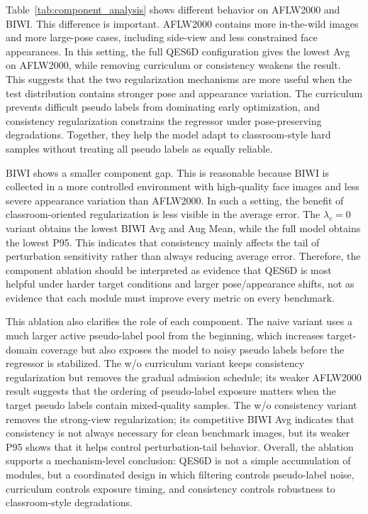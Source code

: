 \documentclass[preprint,12pt]{elsarticle}
\begin{document}
Table~\ref{tab:component_analysis} shows different behavior on AFLW2000 and BIWI. This difference is important. AFLW2000 contains more in-the-wild images and more large-pose cases, including side-view and less constrained face appearances. In this setting, the full QES6D configuration gives the lowest Avg on AFLW2000, while removing curriculum or consistency weakens the result. This suggests that the two regularization mechanisms are more useful when the test distribution contains stronger pose and appearance variation. The curriculum prevents difficult pseudo labels from dominating early optimization, and consistency regularization constrains the regressor under pose-preserving degradations. Together, they help the model adapt to classroom-style hard samples without treating all pseudo labels as equally reliable.

BIWI shows a smaller component gap. This is reasonable because BIWI is collected in a more controlled environment with high-quality face images and less severe appearance variation than AFLW2000. In such a setting, the benefit of classroom-oriented regularization is less visible in the average error. The $\lambda_c=0$ variant obtains the lowest BIWI Avg and Aug Mean, while the full model obtains the lowest P95. This indicates that consistency mainly affects the tail of perturbation sensitivity rather than always reducing average error. Therefore, the component ablation should be interpreted as evidence that QES6D is most helpful under harder target conditions and larger pose/appearance shifts, not as evidence that each module must improve every metric on every benchmark.

This ablation also clarifies the role of each component. The naive variant uses a much larger active pseudo-label pool from the beginning, which increases target-domain coverage but also exposes the model to noisy pseudo labels before the regressor is stabilized. The w/o curriculum variant keeps consistency regularization but removes the gradual admission schedule; its weaker AFLW2000 result suggests that the ordering of pseudo-label exposure matters when the target pseudo labels contain mixed-quality samples. The w/o consistency variant removes the strong-view regularization; its competitive BIWI Avg indicates that consistency is not always necessary for clean benchmark images, but its weaker P95 shows that it helps control perturbation-tail behavior. Overall, the ablation supports a mechanism-level conclusion: QES6D is not a simple accumulation of modules, but a coordinated design in which filtering controls pseudo-label noise, curriculum controls exposure timing, and consistency controls robustness to classroom-style degradations.
\end{document}
